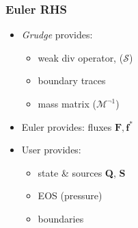 \begin{frame}\frametitle{Euler RHS}
\begin{multicols}{2}
\begin{itemize}
  \item \textit{Grudge} provides:
  \begin{itemize}
    \item weak div operator, ($\mathcal{S}$)
    \item boundary traces %
    \item mass matrix ($\mathcal{M}^{\neg 1}$)
  \end{itemize}
  \item Euler provides: fluxes $\mathbf{F}, \mathbf{f}^{*}$
  \item User provides:
  \begin{itemize}
  \item state \& sources \textbf{Q}, \textbf{S}
  \item EOS (pressure)
  \item boundaries
  \end{itemize}
\end{itemize}
\end{multicols}
% 
%  
%  
\end{frame}

